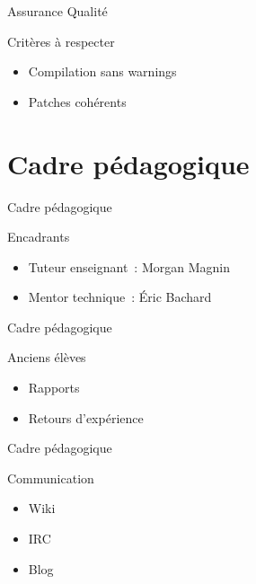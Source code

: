 \documentclass[handout]{beamer}
\begin{document}
\begin{frame}{Assurance Qualité}
    \begin{block}{Critères à respecter}
        \begin{itemize}[<+->]
            \item Compilation sans warnings
            \item Patches cohérents
        \end{itemize}
    \end{block}
\end{frame}

\section{Cadre pédagogique}

\begin{frame}{Cadre pédagogique}
    \begin{block}{Encadrants}
        \begin{itemize}[<+->]
            \item Tuteur enseignant~: Morgan Magnin
            \item Mentor technique~: Éric Bachard
        \end{itemize}
    \end{block}
\end{frame}

\begin{frame}{Cadre pédagogique}
    \begin{block}{Anciens élèves}
        \begin{itemize}[<+->]
            \item Rapports
            \item Retours d'expérience
        \end{itemize}
    \end{block}
\end{frame}

\begin{frame}{Cadre pédagogique}
    \begin{block}{Communication}
        \begin{itemize}[<+->]
            \item Wiki
            \item IRC
            \item Blog
        \end{itemize}
    \end{block}
\end{frame}
\end{document}
